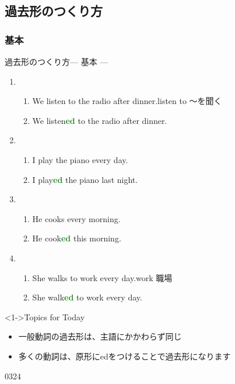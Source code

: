 \documentclass[aspectratio=169,xcolor={dvipsnames,table}]{beamer}
\newcommand{\myaudio}[1]{\href{#1}{\faVolumeUp}}
\begin{document}
\subsection{過去形のつくり方}
\subsubsection{基本}
\begin{frame}[plain]{過去形のつくり方--- 基本 ---}
 
\begin{enumerate}
 \item<2-> \begin{enumerate}
	\item We listen to the radio after dinner.\hfill{\scriptsize listen to ～を聞く\,}
	\item We listen\textcolor{ForestGreen}{\bfseries ed} to the radio after dinner.
       \end{enumerate}
 \item<3-> \begin{enumerate}
	\item I play the piano every day.
	\item I play\textcolor{ForestGreen}{\bfseries ed} the piano last night.
       \end{enumerate}
 \item<4-> \begin{enumerate}
	\item He cooks every morning.
	\item He cook\textcolor{ForestGreen}{\bfseries ed} this morning.
       \end{enumerate}

 \item<5-> \begin{enumerate}
	\item She walks to work every day.\hfill{}{\scriptsize work  職場}
	\item She walk\textcolor{ForestGreen}{\bfseries ed} to work every day.
       \end{enumerate}
\end{enumerate}

\begin{block}<1->{Topics for Today}\small
\begin{itemize}[square]
 \item 一般動詞の過去形は、主語にかかわらず同じ
 \item 多くの動詞は、原形にedをつけることで過去形になります
\end{itemize}
\end{block}
\hfill{\tiny 0324}\,{\scriptsize \myaudio{./audio/025_past_do_02.mp3}}

\end{frame}
\end{document}
